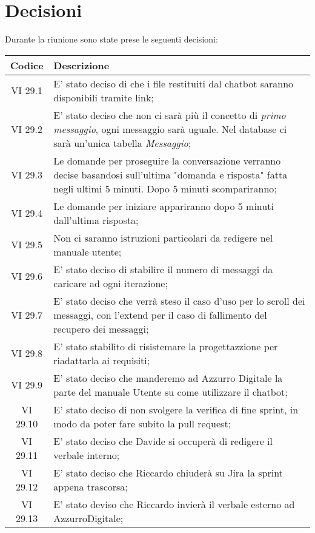 
\section{Decisioni}

Durante la riunione sono state prese le seguenti decisioni:

\vspace{0.5cm}

\begin{table}[htbp]
    \centering
    \begin{tabular}{|c|p{}|}
        \hline
        \rowcolor[gray]{0.75}
        \textbf{Codice} & \textbf{Descrizione}\\
        \hline
        VI 29.1 & E' stato deciso di che i file restituiti dal chatbot saranno disponibili tramite link;\\ 
        \hline
        VI 29.2 & E' stato deciso che non ci sarà più il concetto di \emph{primo messaggio}, ogni messaggio sarà uguale. Nel database ci sarà un'unica tabella \emph{Messaggio};\\ 
        \hline
        VI 29.3 & Le domande per proseguire la conversazione verranno decise basandosi sull'ultima "domanda e risposta" fatta negli ultimi 5 minuti. Dopo 5 minuti scompariranno;\\ 
        \hline
        VI 29.4 & Le domande per iniziare appariranno dopo 5 minuti dall'ultima risposta;\\ 
        \hline
        VI 29.5 & Non ci saranno istruzioni particolari da redigere nel manuale utente;\\ 
        \hline
        VI 29.6 & E' stato deciso di stabilire il numero di messaggi da caricare ad ogni iterazione;\\ 
        \hline
        VI 29.7 & E' stato deciso che verrà steso il caso d'uso per lo scroll dei messaggi, con l'extend per il caso di fallimento del recupero dei messaggi;\\ 
        \hline
        VI 29.8 & E' stato stabilito di risistemare la progettazzione per riadattarla ai requisiti;\\ 
        \hline
        VI 29.9 & E' stato deciso che manderemo ad Azzurro Digitale la parte del manuale Utente su come utilizzare il chatbot;\\ 
        \hline
        VI 29.10 & E' stato deciso di non svolgere la verifica di fine sprint, in modo da poter fare subito la pull request;\\ 
        \hline
        VI 29.11 & E' stato deciso che Davide si occuperà di redigere il verbale interno;\\ 
        \hline
        VI 29.12 & E' stato deciso che Riccardo chiuderà su Jira la sprint appena trascorsa;\\ 
        \hline
        VI 29.13 & E' stato deviso che Riccardo invierà il verbale esterno ad AzzurroDigitale;\\ 
        \hline
    \end{tabular}
\end{table}